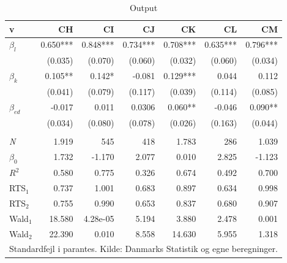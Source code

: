 \begin{table}[tb]
	\centering
	\caption{Output}
	\label{tab:Output2}
	\begin{tabular}{@{}lrrrrrr@{}}
		\toprule
		v            & CH       & CI       & CJ       & CK       & CL       & CM       \\ \midrule
		$\beta_l$    & 0.650*** & 0.848*** & 0.734*** & 0.708*** & 0.635*** & 0.796*** \\
		& (0.035)  & (0.070)  & (0.060)  & (0.032)  & (0.060)  & (0.034)  \\
		$\beta_k$    & 0.105**  & 0.142*   & -0.081   & 0.129*** & 0.044    & 0.112    \\
		& (0.041)  & (0.079)  & (0.117)  & (0.039)  & (0.114)  & (0.085)  \\
		$\beta_{ed}$ & -0.017   & 0.011    & 0.0306   & 0.060**  & -0.046   & 0.090**  \\
		& (0.034)  & (0.080)  & (0.078)  & (0.026)  & (0.163)  & (0.044)  \\
		&          &          &          &          &          &          \\
		\emph{N} & 1.919    & 545      & 418      & 1.783    & 286      & 1.039    \\
		$\beta_0$    & 1.732    & -1.170   & 2.077    & 0.010    & 2.825    & -1.123   \\
		$R^2$        & 0.580    & 0.775    & 0.326    & 0.674    & 0.492    & 0.700    \\
		RTS$_1$      & 0.737    & 1.001    & 0.683    & 0.897    & 0.634    & 0.998    \\
		RTS$_2$      & 0.755    & 0.990    & 0.653    & 0.837    & 0.680    & 0.907    \\
		Wald$_1$     & 18.580   & 4.28e-05 & 5.194    & 3.880    & 2.478    & 0.001    \\
		Wald$_2$     & 22.390   & 0.010    & 8.558    & 14.630   & 5.955    & 1.318   
		\\ \midrule
		\multicolumn{7}{l}{Standardfejl i parantes. Kilde: Danmarks Statistik og egne beregninger.} \\
		\bottomrule
	\end{tabular}
\end{table}
